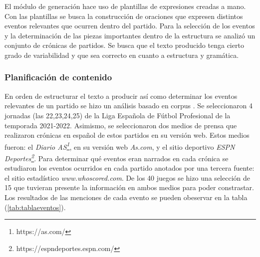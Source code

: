     El módulo de generación hace uso de plantillas de expresiones creadas a mano. Con las plantillas se busca la 
construcción de oraciones que expresen distintos eventos relevantes que ocurren dentro del partido. Para la selección de 
los eventos y la determinación de las piezas importantes dentro de la estructura se analizó un conjunto de crónicas de partidos. 
Se busca que el texto producido tenga cierto grado de variabilidad y que sea correcto en cuanto a estructura y gramática.


\subsubsection{Planificación de contenido}

    En orden de estructurar el texto a producir así como determinar los eventos relevantes de un partido se hizo un análisis basado en 
corpus . Se seleccionaron 4 jornadas (las 22,23,24,25) de la Liga Española de Fútbol Profesional de la temporada 
2021-2022. Asimismo, se seleccionaron dos medios de prensa que realizaron crónicas en español de estos partidos en su versión web. Estos medios 
fueron: el \textit{Diario AS\footnote[1]{https://as.com/}}, en su versión web \textit{As.com}, y el sitio deportivo 
\textit{ESPN Deportes\footnote[2]{https://espndeportes.espn.com/}}. Para determinar qué eventos eran narrados en cada crónica se 
estudiaron los eventos ocurridos en cada partido anotados por una tercera fuente: el sitio estadístico \textit{www.whoscored.com}. 
De los 40 juegos se hizo una selección de 15 que tuvieran presente la información en ambos medios para poder constrastar. Los resultados de las 
menciones de cada evento se pueden obeservar en la tabla (\ref{tab:tablaeventos}).\\

